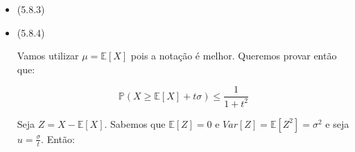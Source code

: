 \documentclass{article}
\begin{document}
\begin{itemize}
	\item (5.8.3)



	\item (5.8.4)

	      Vamos utilizar \(\mu = \mathbb{E}[X]\) pois a notação é melhor. Queremos provar então que:

	      \[\mathbb{P}(X \geq \mathbb{E}[X] + t \sigma) \leq \frac{1}{1 + t^2}\]

	      Seja \(Z = X - \mathbb{E}[X]\). Sabemos que \(\mathbb{E}[Z] = 0\) e \(Var[Z] = \mathbb{E}[Z^2] = \sigma^2\)
	      e seja \(u = \frac{\sigma}{t}\). Então:


\end{itemize}
\end{document}
